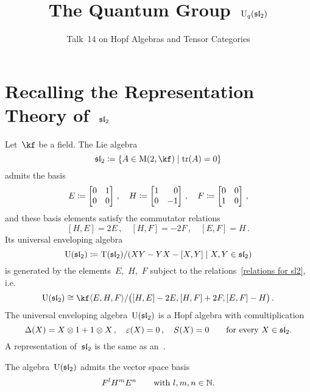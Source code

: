 \documentclass[a4paper, 11pt, oneside]{scrartcl}
\title{The Quantum Group~$\operatorname{U}_q(\mathfrak{sl}_2)$}
\subtitle{Talk~14 on Hopf Algebras and Tensor Categories}
\author{}
\date{}
\begin{document}
\maketitle

\vspace{-4em}





\section{Recalling the Representation Theory of~$\mathfrak{sl}_2$}

Let~$\kf$ be a field.
The Lie algebra
\[
  \sllie_2
  \defined
  \{
    A \in \Mat(2, \kf)
  \suchthat
    \tr(A) = 0
  \}
\]
admits the basis
\[
  E
  \defined
  \begin{bmatrix}
    0 & 1 \\
    0 & 0
  \end{bmatrix} \,,
  \quad
  H
  \defined
  \begin{bmatrix*}[r]
    1 &  0 \\
    0 & -1
  \end{bmatrix*} \,,
  \quad
  F
  \defined
  \begin{bmatrix}
    0 & 0 \\
    1 & 0
  \end{bmatrix} \,,
\]
and these basis elements satisfy the commutator relations
\begin{equation}
  \label{relations for sl2}
  [H, E] = 2E \,,
  \quad
  [H, F] = -2F \,,
  \quad
  [E, F] = H \,.
\end{equation}
Its universal enveloping algebra
\[
  \Univ(\sllie_2)
  \defined
  \Tensor(\sllie_2)
  /
  \genideal{ XY - YX - [X,Y] \suchthat X, Y \in \sllie_2 }
\]
is generated by the elements~$E$,~$H$,~$F$ subject to the relations~\eqref{relations for sl2}, i.e.
\[
  \Univ(\sllie_2)
  \cong
  \kf\gen{E, H, F}
  /
  \genideal[\big]{[H,E] - 2E, [H,F] + 2F, [E,F] - H} \,.
\]
The universal enveloping algebra~$\operatorname{U}(\mathfrak{sl}_2)$ is a Hopf algebra with comultiplication
\[
  \Delta(X) = X \otimes 1 + 1 \otimes X \,,
  \quad
  \varepsilon(X) = 0 \,,
  \quad
  S(X) = 0
  \qquad
  \text{for every~$X \in \mathfrak{sl}_2$}.
\]
A representation of~$\mathfrak{sl}_2$ is the same as an~.

\begin{theorem}
  The algebra~$\operatorname{U}(\mathfrak{sl}_2)$ admits the vector space basis
  \[
    F^l H^m E^n
    \qquad
    \text{with~$l, m, n \in \mathbb{N}$.}
  \]
\end{theorem}
\end{document}
